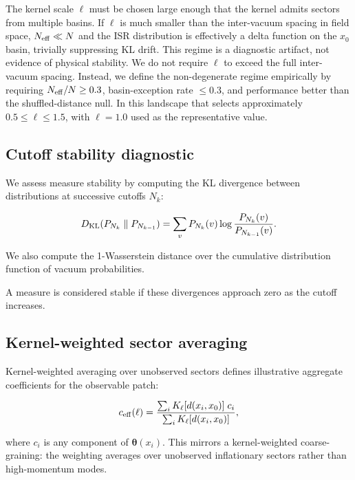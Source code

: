 The kernel scale $\ell$ must be chosen large enough that the kernel
admits sectors from multiple basins.
If $\ell$ is much smaller than the inter-vacuum spacing in field space,
$N_{\rm eff} \ll N$ and the ISR distribution is effectively a delta function
on the $x_0$ basin, trivially suppressing KL drift.
This regime is a diagnostic artifact, not evidence of physical stability.
We do not require $\ell$ to exceed the full inter-vacuum spacing.
Instead, we define the non-degenerate regime empirically by requiring
$N_{\rm eff}/N \ge 0.3$, basin-exception rate $\le 0.3$, and performance
better than the shuffled-distance null.
In this landscape that selects approximately $0.5 \le \ell \le 1.5$,
with $\ell = 1.0$ used as the representative value.

\subsection{Cutoff stability diagnostic}

We assess measure stability by computing the KL divergence between
distributions at successive cutoffs $N_k$:

\begin{equation}
\label{eq:kl_diagnostic}
D_{\rm KL}(P_{N_k} \parallel P_{N_{k-1}})
= \sum_v P_{N_k}(v) \log\frac{P_{N_k}(v)}{P_{N_{k-1}}(v)}.
\end{equation}

We also compute the 1-Wasserstein distance over the cumulative
distribution function of vacuum probabilities.

A measure is considered stable if these divergences approach zero
as the cutoff increases.

\subsection{Kernel-weighted sector averaging}

Kernel-weighted averaging over unobserved sectors defines illustrative
aggregate coefficients for the observable patch:

\begin{equation}
\label{eq:effective_flow}
c_{\rm eff}(\ell) = \frac{\sum_i K_\ell[d(x_i,x_0)] \; c_i}
                         {\sum_i K_\ell[d(x_i,x_0)]},
\end{equation}

where $c_i$ is any component of $\boldsymbol{\theta}(x_i)$.
This mirrors a kernel-weighted coarse-graining: the weighting averages
over unobserved inflationary sectors rather than high-momentum modes.

